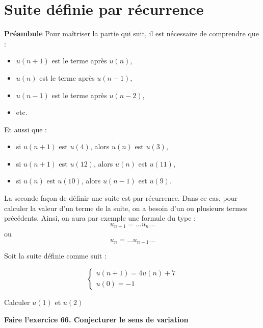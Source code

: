 \documentclass[a4paper,12pt]{article}
\begin{document}
\section*{Suite définie par récurrence}

\textbf{Préambule}
\vspace{1em}
Pour maîtriser la partie qui suit, il est nécessaire de comprendre que : 
\begin{itemize}[noitemsep]
    \item $u(n+1)$ est le terme après $u(n)$,
    \item $u(n)$ est le terme après $u(n-1)$,
    \item $u(n-1)$ est le terme après $u(n-2)$,
    \item etc.
\end{itemize}

Et aussi que :
\begin{itemize}[noitemsep]
    \item si $u(n+1)$ est $u(4)$, alors $u(n)$ est $u(3)$,
    \item si $u(n+1)$ est $u(12)$, alors $u(n)$ est $u(11)$,
    \item si $u(n)$ est $u(10)$, alors $u(n-1)$ est $u(9)$.
\end{itemize}


La seconde façon de définir une suite est par récurrence. Dans ce cas, pour calculer la valeur d'un terme de la suite, on a besoin d'un ou plusieurs termes précédents. Ainsi, on aura par exemple une formule du type :
\[
u_{n+1} = \ldots u_n \ldots
\]
ou
\[
u_n = \ldots u_{n-1} \ldots
\]

\begin{tcolorbox}[colback=blue!10!white, colframe=blue!75!black, title=Exercices]

  Soit la suite définie comme suit : 

  \[
    \left\{
      \begin{array}{ll}
            u(n+1) = 4 u(n) + 7 \\
            u(0) = -1 
        \end{array}
      \right.
    \]

  Calculer $u(1)$ et $u(2)$

  {\vspace{6em}}
  \textbf{Faire l'exercice 66. Conjecturer le sens de variation}
\end{tcolorbox}
\end{document}
